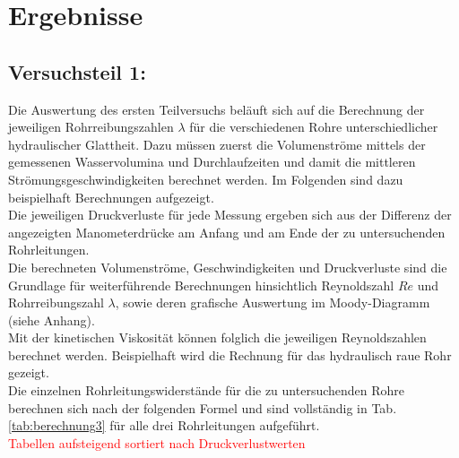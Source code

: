 \chapter{Ergebnisse}
\label{sec:ergebnisse}

\section{Versuchsteil 1: }
Die Auswertung des ersten Teilversuchs beläuft sich auf die Berechnung der jeweiligen Rohrreibungszahlen $\lambda$ für die verschiedenen Rohre unterschiedlicher hydraulischer Glattheit. Dazu müssen zuerst die Volumenströme mittels der gemessenen Wasservolumina und Durchlaufzeiten und damit die mittleren Strömungsgeschwindigkeiten berechnet werden. Im Folgenden sind dazu beispielhaft Berechnungen aufgezeigt. \\ 
Die jeweiligen Druckverluste für jede Messung ergeben sich aus der Differenz der angezeigten Manometerdrücke am Anfang und am Ende der zu untersuchenden Rohrleitungen. \\
Die berechneten Volumenströme, Geschwindigkeiten und Druckverluste sind die Grundlage für weiterführende Berechnungen hinsichtlich Reynoldszahl $Re$ und Rohrreibungszahl $\lambda$, sowie deren grafische Auswertung im Moody-Diagramm \linebreak (siehe Anhang).\\
Mit der kinetischen Viskosität können folglich die jeweiligen Reynoldszahlen berechnet werden. Beispielhaft wird die Rechnung für das hydraulisch raue Rohr gezeigt.\\
Die einzelnen Rohrleitungswiderstände für die zu untersuchenden Rohre berechnen sich nach der folgenden Formel und sind vollständig in Tab. \ref{tab:berechnung3} für alle drei Rohrleitungen aufgeführt.\\ 

\textcolor{red}{Tabellen aufsteigend sortiert nach Druckverlustwerten}

